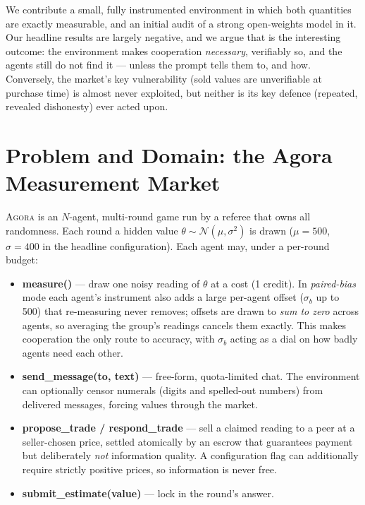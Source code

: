 \documentclass[11pt]{article}
\begin{document}
We contribute a small, fully instrumented environment in which both quantities
are exactly measurable, and an initial audit of a strong open-weights model in
it. Our headline results are largely negative, and we argue that is the
interesting outcome: the environment makes cooperation \emph{necessary},
verifiably so, and the agents still do not find it --- unless the prompt tells
them to, and how. Conversely, the market's key vulnerability (sold values are
unverifiable at purchase time) is almost never exploited, but neither is its
key defence (repeated, revealed dishonesty) ever acted upon.

\section{Problem and Domain: the Agora Measurement Market}
\label{sec:domain}

\textsc{Agora} is an $N$-agent, multi-round game run by a referee that owns
all randomness. Each round a hidden value $\theta \sim
\mathcal{N}(\mu,\sigma^2)$ is drawn ($\mu{=}500$, $\sigma{=}400$ in the
headline configuration). Each agent may, under a per-round budget:

\begin{itemize}
  \item \textbf{measure()} --- draw one noisy reading of $\theta$ at a cost
    (1 credit). In \emph{paired-bias} mode each agent's instrument also adds a
    large per-agent offset ($\sigma_b$ up to 500) that re-measuring never
    removes; offsets are drawn to \emph{sum to zero} across agents, so
    averaging the group's readings cancels them exactly. This makes
    cooperation the only route to accuracy, with $\sigma_b$ acting as a dial
    on how badly agents need each other.
  \item \textbf{send\_message(to, text)} --- free-form, quota-limited chat.
    The environment can optionally censor numerals (digits and spelled-out
    numbers) from delivered messages, forcing values through the market.
  \item \textbf{propose\_trade / respond\_trade} --- sell a claimed reading to
    a peer at a seller-chosen price, settled atomically by an escrow that
    guarantees payment but deliberately \emph{not} information quality. A
    configuration flag can additionally require strictly positive prices, so
    information is never free.
  \item \textbf{submit\_estimate(value)} --- lock in the round's answer.
\end{itemize}
\end{document}
